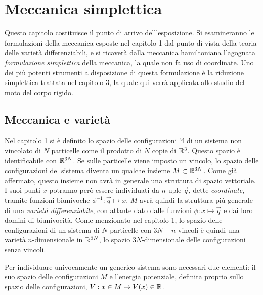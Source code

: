 \chapter{Meccanica simplettica}
Questo capitolo costituisce il punto di arrivo dell'esposizione. Si esamineranno le formulazioni della meccanica esposte nel capitolo 1 dal punto di vista della teoria delle varietà differenziabili, e si ricaverà dalla meccanica hamiltoniana l'agognata \emph{formulazione simplettica} della meccanica, la quale non fa uso di coordinate. Uno dei più potenti strumenti a disposizione di questa formulazione è la riduzione simplettica trattata nel capitolo 3, la quale qui verrà applicata allo studio del moto del corpo rigido.

\section{Meccanica e varietà}
Nel capitolo 1 si è definito lo spazio delle configurazioni $\mathbb{M}$ di un sistema non vincolato di $N$ particelle come il prodotto di $N$ copie di $\mathbb{R}^{3}$. Questo spazio è identificabile con $\mathbb{R}^{3N}$. Se sulle particelle viene imposto un vincolo, lo spazio delle configurazioni del sistema diventa un qualche insieme $M \subset \mathbb{R}^{3N}$. Come già affermato, questo insieme non avrà in generale una struttura di spazio vettoriale. I suoi punti $x$ potranno però essere individuati da $n$-uple $\vec{q}$, dette \emph{coordinate}, tramite funzioni biunivoche $\phi^{-1}: \vec{q} \mapsto x$. $M$ avrà quindi la struttura più generale di una \emph{varietà differenziabile}, con atlante dato dalle funzioni $\phi: x \mapsto \vec{q}$ e dai loro domini di biunivocità. Come menzionato nel capitolo 1, lo spazio delle configurazioni di un sistema di $N$ particelle con $3N-n$ vincoli è quindi una varietà $n$-dimensionale  in $\mathbb{R}^{3N}$, lo spazio $3N$-dimensionale delle configurazioni senza vincoli. 

Per individuare univocamente un generico sistema sono necessari due elementi: il suo spazio delle configurazioni $M$ e l'energia potenziale, definita proprio sullo spazio delle configurazioni, $V: x \in M \mapsto V(x) \in \mathbb{R}$.  


